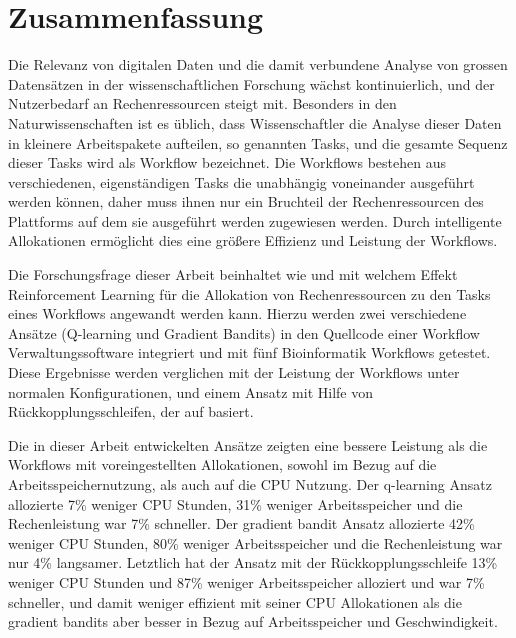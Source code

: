 \section*{Zusammenfassung}

Die Relevanz von digitalen Daten und die damit verbundene Analyse von grossen Datensätzen in der wissenschaftlichen Forschung wächst kontinuierlich, und der Nutzerbedarf an Rechenressourcen steigt mit. Besonders in den Naturwissenschaften ist es üblich, dass Wissenschaftler die Analyse dieser Daten in kleinere Arbeitspakete aufteilen, so genannten Tasks, und die gesamte Sequenz dieser Tasks wird als Workflow bezeichnet. Die Workflows bestehen aus verschiedenen, eigenständigen Tasks die unabhängig voneinander ausgeführt werden können, daher muss ihnen nur ein Bruchteil der Rechenressourcen des Plattforms auf dem sie ausgeführt werden zugewiesen werden.  Durch intelligente Allokationen ermöglicht dies eine größere Effizienz und Leistung der Workflows.  

Die Forschungsfrage dieser Arbeit beinhaltet wie und mit welchem Effekt Reinforcement Learning für die Allokation von Rechenressourcen zu den Tasks eines Workflows angewandt werden kann.  Hierzu werden zwei verschiedene Ansätze (Q-learning und Gradient Bandits) in den Quellcode einer Workflow Verwaltungssoftware integriert und mit fünf Bioinformatik Workflows getestet. Diese Ergebnisse werden verglichen mit der Leistung der Workflows unter normalen Konfigurationen, und einem Ansatz mit Hilfe von Rückkopplungsschleifen, der auf \cite{tovarjob,FeedbackBasedAllocation} basiert.

Die in dieser Arbeit entwickelten Ansätze zeigten eine bessere Leistung als die Workflows mit voreingestellten Allokationen, sowohl im Bezug auf die Arbeitsspeichernutzung, als auch auf die CPU Nutzung.  Der q-learning Ansatz allozierte 7\% weniger CPU Stunden, 31\% weniger Arbeitsspeicher und die Rechenleistung war 7\% schneller. Der gradient bandit Ansatz allozierte 42\% weniger CPU Stunden, 80\% weniger Arbeitsspeicher und die Rechenleistung war nur 4\% langsamer. Letztlich hat der Ansatz mit der Rückkopplungsschleife 13\% weniger CPU Stunden und 87\% weniger Arbeitsspeicher alloziert und war 7\% schneller, und damit weniger effizient mit seiner CPU Allokationen als die gradient bandits aber besser in Bezug auf Arbeitsspeicher und Geschwindigkeit.


